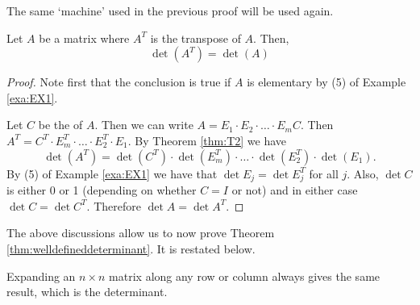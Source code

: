 The same `machine' used in the previous proof will be used again. 

\begin{theorem}{}\label{thm:T.T} 
Let $A$ be a matrix where $A^T$ is the transpose of $A$. Then,
\begin{equation*}
\det\left(A^T\right) = \det \left( A \right)
\end{equation*}
\end{theorem} 

\begin{proof} 
Note first that the conclusion is true if $A$ is elementary by (5) of Example \ref{exa:EX1}. 

Let $C$ be the \rref\;of $A$. Then we can write 
$A= E_1\cdot E_2\cdot \dots\cdot E_m C$. 
Then $A^T=C^T\cdot E_m^T\cdot \dots \cdot E_2^T\cdot E_1$. 
By Theorem \ref{thm:T2} we have 
\[
\det (A^T)=\det (C^T)\cdot \det (E_m^T)\cdot \dots \cdot \det (E_2^T)\cdot \det(E_1).
\] 
By (5) of Example \ref{exa:EX1} we have that $\det E_j=\det E_j^T$ for all $j$. 
Also, $\det C$ is either 0 or 1 (depending on whether $C=I$ or not) and in either 
case $\det C=\det C^T$. Therefore $\det A=\det A^T$. 
\end{proof} 

The above discussions allow us to now prove Theorem \ref{thm:welldefineddeterminant}. It is restated below. 
 
\begin{theorem}{}
Expanding an $n\times n$ matrix along any row or column always gives the same result, which is the determinant. 
\end{theorem} 

